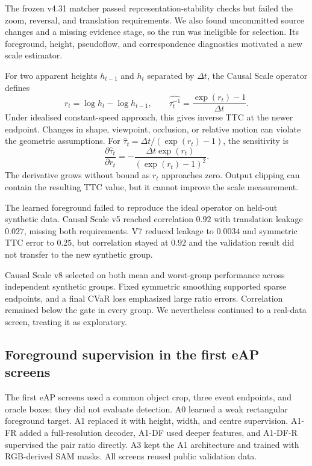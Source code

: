 The frozen v4.31 matcher passed representation-stability checks but failed the zoom, reversal, and translation requirements. We also found uncommitted source changes and a missing evidence stage, so the run was ineligible for selection. Its foreground, height, pseudoflow, and correspondence diagnostics motivated a new scale estimator.

For two apparent heights $h_{t-1}$ and $h_t$ separated by $\Delta t$, the Causal Scale operator defines
\begin{equation}
 r_t=\log h_t-\log h_{t-1},\qquad
 \widehat{\tau_t^{-1}}=\frac{\exp(r_t)-1}{\Delta t}.
 \label{eq:early-scale}
\end{equation}
Under idealised constant-speed approach, this gives inverse TTC at the newer endpoint. Changes in shape, viewpoint, occlusion, or relative motion can violate the geometric assumptions. For $\hat\tau_t=\Delta t/(\exp(r_t)-1)$, the sensitivity is
\begin{equation}
 \frac{\partial\hat\tau_t}{\partial r_t}
 =-\frac{\Delta t\exp(r_t)}{(\exp(r_t)-1)^2}.
\end{equation}
The derivative grows without bound as $r_t$ approaches zero. Output clipping can contain the resulting TTC value, but it cannot improve the scale measurement.

The learned foreground failed to reproduce the ideal operator on held-out synthetic data. Causal Scale v5 reached correlation $0.92$ with translation leakage $0.027$, missing both requirements. V7 reduced leakage to $0.0034$ and symmetric TTC error to $0.25$, but correlation stayed at $0.92$ and the validation result did not transfer to the new synthetic group. 

Causal Scale v8 selected on both mean and worst-group performance across independent synthetic groups. Fixed symmetric smoothing supported sparse endpoints, and a final CVaR loss emphasized large ratio errors. Correlation remained below the gate in every group. We nevertheless continued to a real-data screen, treating it as exploratory. 

\subsection{Foreground supervision in the first eAP screens}

The first eAP screens used a common object crop, three event endpoints, and oracle boxes; they did not evaluate detection. A0 learned a weak rectangular foreground target. A1 replaced it with height, width, and centre supervision. A1-FR added a full-resolution decoder, A1-DF used deeper features, and A1-DF-R supervised the pair ratio directly. A3 kept the A1 architecture and trained with RGB-derived SAM masks. All screens reused public validation data.

